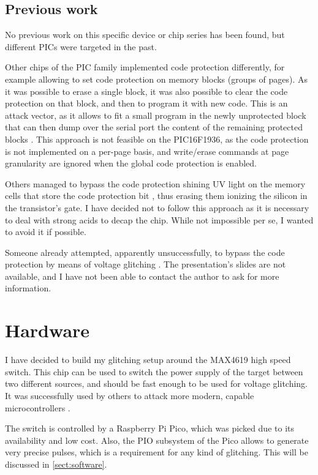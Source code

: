\documentclass[a4paper,english,twoside,10pt]{article}
\begin{document}
\subsection{Previous work}
No previous work on this specific device or chip series has been found, but different PICs were targeted in the past.

Other chips of the PIC family implemented code protection differently, for example allowing to set code protection on memory blocks (groups of pages). As it was possible to erase a single block, it was also possible to clear the code protection on that block, and then to program it with new code. This is an attack vector, as it allows to fit a small program in the newly unprotected block that can then dump over the serial port the content of the remaining protected blocks \cite{meriac2010heart}. This approach is not feasible on the PIC16F1936, as the code protection is not implemented on a per-page basis, and write/erase commands at page granularity are ignored when the global code protection is enabled.

Others managed to bypass the code protection shining UV light on the memory cells that store the code protection bit \cite{bunniepic}, thus erasing them ionizing the silicon in the transistor's gate. I have decided not to follow this approach as it is necessary to deal with strong acids to decap the chip. While not impossible per se, I wanted to avoid it if possible.

Someone already attempted, apparently unsuccessfully, to bypass the code protection by means of voltage glitching \cite{silviocopyprotection}. The presentation's slides are not available, and I have not been able to contact the author to ask for more information.



\section{Hardware}
I have decided to build my glitching setup around the MAX4619 \cite{maxim:MAX4617-MAX4619} high speed switch. This chip can be used to switch the power supply of the target between two different sources, and should be fast enough to be used for voltage glitching. It was successfully used by others to attack more modern, capable microcontrollers \cite{gerlinskyLPC}.

The switch is controlled by a Raspberry Pi Pico, which was picked due to its availability and low cost. Also, the PIO subsystem of the Pico allows to generate very precise pulses, which is a requirement for any kind of glitching. This will be discussed in \cref{sect:software}.
\end{document}
